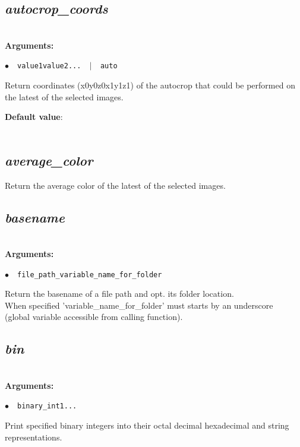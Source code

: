 \documentclass[a4paper,10.5pt,twoside]{book}
\def\comma{\discretionary{,}{}{,}}
\newcommand{\Cb}[1]{\textcolor{cb}{#1}}
\newcommand{\Cc}[1]{\textcolor{cc}{#1}}
\begin{document}
\subsection{\emph{autocrop\_coords} }\vspace*{-0.7em}
~\\\textbf{\Cb{Arguments: }}\begin{flushleft}
{\small \Cb{\hspace*{0.5cm}$\bullet$~~\texttt{value1{\comma}value2{\comma}... ~$|$~ auto}}}\end{flushleft}
Return coordinates (x0{\comma}y0{\comma}z0{\comma}x1{\comma}y1{\comma}z1) of the autocrop that could be performed on the latest of the selected images.
\begin{flushleft}\Cc{\textbf{Default value}:\\~\\\hspace*{0.5cm}{\small $\bullet$~~\texttt{'auto'}}}\end{flushleft}


\subsection{\emph{average\_color} }\vspace*{-0.7em}
Return the average color of the latest of the selected images.


\subsection{\emph{basename} }\vspace*{-0.7em}
~\\\textbf{\Cb{Arguments: }}\begin{flushleft}
{\small \Cb{\hspace*{0.5cm}$\bullet$~~\texttt{file\_path{\comma}\_variable\_name\_for\_folder}}}\end{flushleft}
Return the basename of a file path{\comma} and opt. its folder location.
~\\When specified 'variable\_name\_for\_folder' must starts by an underscore
~\\(global variable accessible from calling function).


\subsection{\emph{bin} }\vspace*{-0.7em}
~\\\textbf{\Cb{Arguments: }}\begin{flushleft}
{\small \Cb{\hspace*{0.5cm}$\bullet$~~\texttt{binary\_int1{\comma}...}}}\end{flushleft}
Print specified binary integers into their octal{\comma} decimal{\comma} hexadecimal and string representations.
\end{document}
